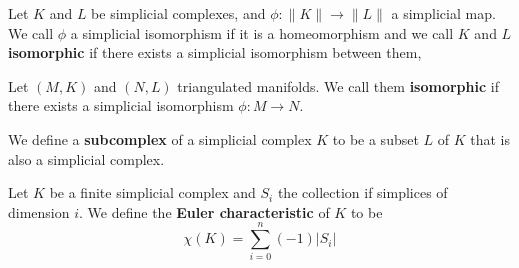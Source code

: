 \begin{definition}
    Let $K$ and  $L$ be simplicial complexes, and  $\phi:\|K\| \xrightarrow{}
    \|L\|$ a simplicial map. We call $\phi$ a simplicial isomorphism if it is a
    homeomorphism and we call  $K$ and  $L$  \textbf{isomorphic} if there exists
    a simplicial isomorphism between them,
\end{definition}

\begin{definition}
    Let $(M,K)$ and $(N,L)$ triangulated manifolds. We call them
    \textbf{isomorphic} if there exists a simplicial isomorphism $\phi:M
    \xrightarrow{} N$.
\end{definition}

\begin{definition}
    We define a \textbf{subcomplex} of a simplicial complex $K$ to be a subset
    $L$ of  $K$ that is also a simplicial complex.
\end{definition}

\begin{definition}
    Let $K$ be a finite simplicial complex and $S_i$ the collection if simplices
    of dimension $i$. We define the \textbf{Euler characteristic} of $K$ to be
    \begin{equation*}
        \chi(K)=\sum_{i=0}^n{(-1)|S_i|}
    \end{equation*}
\end{definition}
